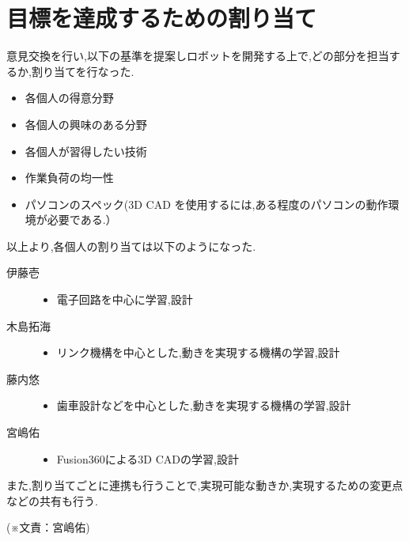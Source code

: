 \begin{comment}
メンバーに割り当てられた課題、課題を割り当てたプロセス
\end{comment}
\section{目標を達成するための割り当て}
意見交換を行い,以下の基準を提案しロボットを開発する上で,どの部分を担当するか,割り当てを行なった.
 \begin{itemize}
\item 各個人の得意分野
\item 各個人の興味のある分野
\item 各個人が習得したい技術
\item  作業負荷の均一性
\item パソコンのスペック(3D CAD を使用するには,ある程度のパソコンの動作環境が必要である.）
\end{itemize}
以上より,各個人の割り当ては以下のようになった.
\begin{description}
   \item[伊藤壱]\mbox{}
      \begin{itemize}
 \item  電子回路を中心に学習,設計
      \end{itemize}
   \item[木島拓海]\mbox{}
      \begin{itemize}
      \item リンク機構を中心とした,動きを実現する機構の学習,設計
         \end{itemize}
   \item[藤内悠]\mbox{}
      \begin{itemize}
      \item  歯車設計などを中心とした,動きを実現する機構の学習,設計
      \end{itemize}
   \item[宮嶋佑]\mbox{}   
   \begin{itemize}
   \item Fusion360による3D CADの学習,設計
   \end{itemize}
\end{description}
   また,割り当てごとに連携も行うことで,実現可能な動きか,実現するための変更点などの共有も行う.

\begin{flushright}
(※文責：宮嶋佑)
\end{flushright}
